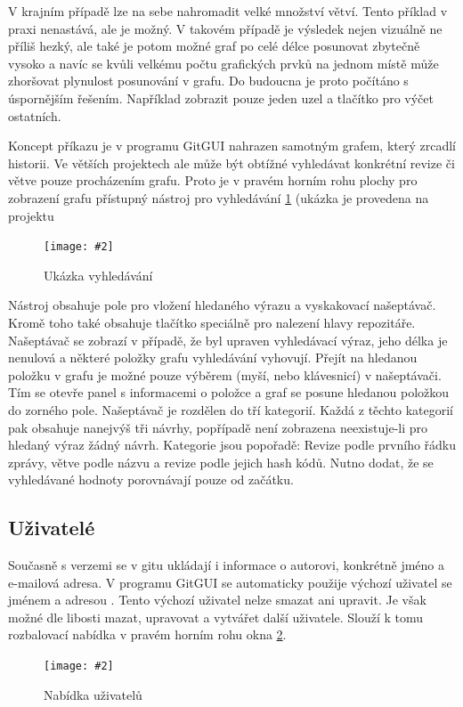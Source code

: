 \documentclass[
  biblatex,
  glossaries,
  index
]{kidiplom}
\newcommand{\pic}[4]{
\begin{figure}[h]
\centering
\texttt{[image: \#2]}
\caption{#3}
\label{fig:#4}
\end{figure}}
\begin{document}
V krajním případě lze na sebe nahromadit velké množství větví. Tento příklad v praxi nenastává, ale je možný. V takovém případě je výsledek nejen vizuálně ne příliš hezký, ale také je potom možné graf po celé délce posunovat zbytečně vysoko a navíc se kvůli velkému počtu grafických prvků na jednom místě může zhoršovat plynulost posunování v grafu. Do budoucna je proto počítáno s úspornějším řešením. Například zobrazit pouze jeden uzel a tlačítko pro výčet ostatních.

Koncept příkazu  je v programu GitGUI nahrazen samotným grafem, který zrcadlí historii. Ve větších projektech ale může být obtížné vyhledávat konkrétní revize či větve pouze procházením grafu. Proto je v pravém horním rohu plochy pro zobrazení grafu přístupný nástroj pro vyhledávání \ref{fig:searchtool} (ukázka je provedena na projektu \cite{libgitreference}

\pic{10cm}{searchbar.png}{Ukázka vyhledávání}{searchtool}

Nástroj obsahuje pole pro vložení hledaného výrazu a vyskakovací našeptávač. Kromě toho také obsahuje tlačítko speciálně pro nalezení hlavy repozitáře. Našeptávač se zobrazí v případě, že byl upraven vyhledávací výraz, jeho délka je nenulová a některé položky grafu vyhledávání vyhovují. Přejít na hledanou položku v grafu je možné pouze výběrem (myší, nebo klávesnicí) v našeptávači. Tím se otevře panel s informacemi o položce a graf se posune hledanou položkou do zorného pole. Našeptávač je rozdělen do tří kategorií. Každá z těchto kategorií pak obsahuje nanejvýš tři návrhy, popřípadě není zobrazena neexistuje-li pro hledaný výraz žádný návrh. Kategorie jsou popořadě: Revize podle prvního řádku zprávy, větve podle názvu a revize podle jejich hash kódů. Nutno dodat, že se vyhledávané hodnoty porovnávají pouze od začátku.

\subsection{Uživatelé}
Současně s verzemi se v gitu ukládají i informace o autorovi, konkrétně jméno a e-mailová adresa. V programu GitGUI se automaticky použije výchozí uživatel se jménem  a adresou \uv{-}. Tento výchozí uživatel nelze smazat ani upravit. Je však možné dle libosti mazat, upravovat a vytvářet další uživatele. Slouží k tomu rozbalovací nabídka v pravém horním rohu okna \ref{fig:users}.

\pic{10cm}{users.png}{Nabídka uživatelů}{users}
\end{document}
